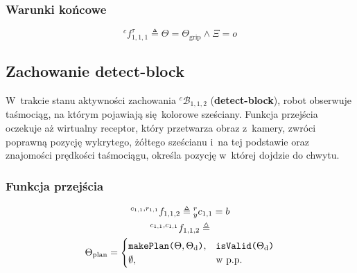 \subsubsection{Warunki końcowe}
\begin{equation}
    {}^{c}f^{\tau}_{1,1,1} \triangleq \Theta = \Theta_{\mathrm{grip}} \land \Xi = o
\end{equation}


\subsection{Zachowanie detect-block}
\label{subsec:cs-detect-block}
W~trakcie stanu aktywności zachowania ${}^{c}\mathcal{B}_{1,1,2}$ (\textbf{detect-block}), robot obserwuje taśmociąg, na którym pojawiają się kolorowe sześciany. Funkcja przejścia oczekuje aż wirtualny receptor, który przetwarza obraz z~kamery, zwróci poprawną pozycję wykrytego, żółtego sześcianu i~na tej podstawie oraz znajomości prędkości taśmociągu, określa pozycję w~której dojdzie do chwytu.

\subsubsection{Funkcja przejścia}
\begin{equation}
    \begin{gathered}
      {}^{c_{1,1}, r_{1,1}}f_{1,1,2} \triangleq {}^{r}_{y}c_{1,1} = b\\        
      {}^{c_{1,1}, c_{1,1}}f_{1,1,2} \triangleq \\ \Theta_{\mathrm{plan}} =
                   \begin{cases}
       			    \text{\texttt{makePlan($\Theta, \Theta_{\mathrm{d}}$)}}, & \text{\texttt{isValid($\Theta_{\mathrm{d}}$)}}\\
                       \emptyset, & \text{w p.p.}
       		    \end{cases}
    \end{gathered}
\end{equation}

